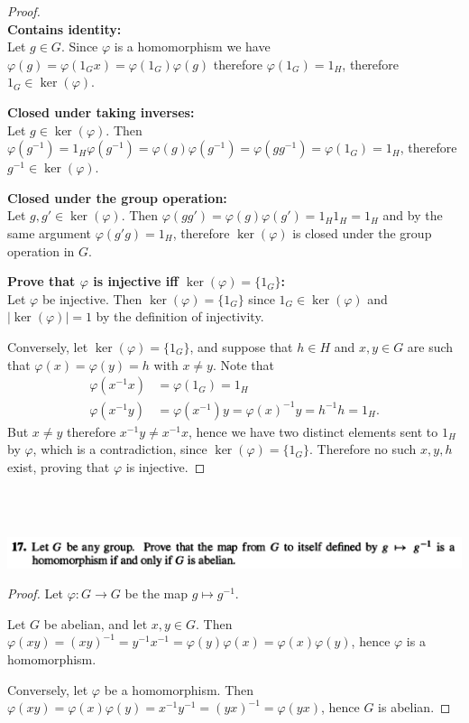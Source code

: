 \begin{proof}~\\
  {\bf Contains identity:}\\
  Let $g \in G$. Since $\varphi$ is a homomorphism we have
  $\varphi(g) = \varphi(1_Gx) = \varphi(1_G)\varphi(g)$ therefore $\varphi(1_G) = 1_H$, therefore $1_G \in \ker(\varphi)$.

  {\bf Closed under taking inverses:}\\
  Let $g \in \ker(\varphi)$. Then
  $\varphi(g^{-1}) = 1_H\varphi(g^{-1}) = \varphi(g)\varphi(g^{-1}) = \varphi(gg^{-1}) = \varphi(1_G) = 1_H$,
  therefore $g^{-1} \in \ker(\varphi)$.

  {\bf Closed under the group operation:}\\
  Let $g, g' \in \ker(\varphi)$. Then $\varphi(gg') = \varphi(g)\varphi(g') = 1_H1_H = 1_H$ and by the same
  argument $\varphi(g'g) = 1_H$, therefore $\ker(\varphi)$ is closed under the group operation in $G$.

  {\bf Prove that $\varphi$ is injective iff $\ker(\varphi) = \{1_G\}$:}\\
  Let $\varphi$ be injective. Then $\ker(\varphi) = \{1_G\}$ since $1_G \in \ker(\varphi)$ and
  $|\ker(\varphi)| = 1$ by the definition of injectivity.

  Conversely, let $\ker(\varphi) = \{1_G\}$, and suppose that $h \in H$ and $x, y \in G$ are such
  that $\varphi(x) = \varphi(y) = h$ with $x \neq y$. Note that
  \begin{align*}
    \varphi(x^{-1}x) &= \varphi(1_G) = 1_H \\
    \varphi(x^{-1}y) &= \varphi(x^{-1})y =  \varphi(x)^{-1}y = h^{-1}h = 1_H.
  \end{align*}
  But $x \neq y$ therefore $x^{-1}y \neq x^{-1}x$, hence we have two distinct elements sent to
  $1_H$ by $\varphi$, which is a contradiction, since $\ker(\varphi) = \{1_G\}$. Therefore no such
  $x, y, h$ exist, proving that $\varphi$ is injective.
\end{proof}


~\\~\\
\begin{mdframed}
\includegraphics[width=400pt]{img/abstract-algebra--nf--3-b28c.png}
\end{mdframed}

\begin{proof}
  Let $\varphi: G \to G$ be the map $g \mapsto g^{-1}$.

  Let $G$ be abelian, and let $x, y \in G$.
  Then $\varphi(xy) = (xy)^{-1} = y^{-1}x^{-1} = \varphi(y)\varphi(x) = \varphi(x)\varphi(y)$, hence $\varphi$ is a homomorphism.

  Conversely, let $\varphi$ be a homomorphism.
  Then $\varphi(xy) = \varphi(x)\varphi(y) = x^{-1}y^{-1} = (yx)^{-1} = \varphi(yx)$, hence $G$ is abelian.
\end{proof}


